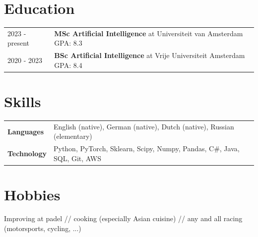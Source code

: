 \documentclass[a4paper,11pt]{article}
\begin{document}
\section{Education}
\begin{tabularx}{\linewidth}{@{}l X@{}}	
2023 - present & \textbf{MSc Artificial Intelligence} at Universiteit van Amsterdam \hfill \normalsize GPA: 8.3 \\

2020 - 2023 & \textbf{BSc Artificial Intelligence} at Vrije Universiteit Amsterdam \hfill GPA: 8.4


\end{tabularx}

\section{Skills}
\begin{tabularx}{\linewidth}{@{}l X@{}}
\textbf{Languages} & English (native), German (native), Dutch (native), Russian (elementary) \\
\textbf{Technology} & Python, PyTorch, Sklearn, Scipy, Numpy, Pandas, C\#, Java, SQL, Git, AWS
\end{tabularx}

\section{Hobbies}
Improving at padel // cooking (especially Asian cuisine) // any and all racing (motorsports, cycling, ...)

\vfill
{}
\end{document}
